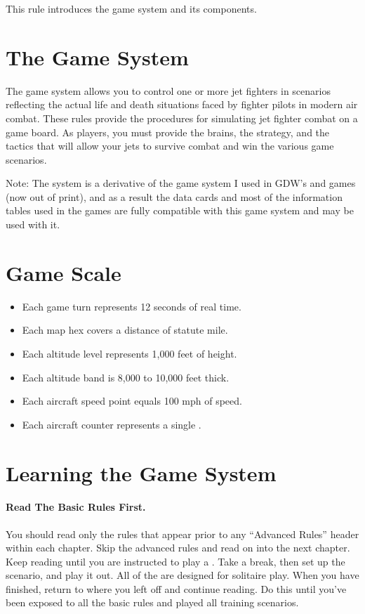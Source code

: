 
This rule introduces the {\AirPow} game system and its components.

\section{The Game System}

The {\AirPow} game system allows you to control one or more jet fighters in scenarios reflecting the actual life and death situations faced by fighter pilots in modern air combat. These rules provide the procedures for simulating jet fighter combat on a game board. As players, you must provide the brains, the strategy, and the tactics that will allow your jets to survive combat and win the various game scenarios.

Note: The {\AirPow} system is a derivative of the game system I used in GDW's {\AirSup} and {\AirStr} games (now out of print), and as a result the data cards and most of the information tables used in the {\AirSup} games are fully compatible with this game system and may be used with it.

\section{Game Scale}

\begin{itemize}
    \item Each game turn represents 12 seconds of real time.
    \item Each map hex covers a distance of {\onethird}  statute mile.
    \item Each altitude level represents 1,000 feet of height.
    \item Each altitude band is 8,000 to 10,000 feet thick.
    \item Each aircraft speed point equals 100 mph of speed.
    \item Each aircraft counter represents a single .
\end{itemize}

\section{Learning the Game System}

\paragraph{Read The Basic Rules First.} You should read only the rules that appear prior to any “Advanced Rules” header within each chapter. Skip the advanced rules and read on into the next chapter. Keep reading until you are instructed to play a . Take a break, then set up the scenario, and play it out. All of the  are designed for solitaire play. When you have finished, return to where you left off and continue reading. Do this until you've been exposed to all the basic rules and played all training scenarios.

